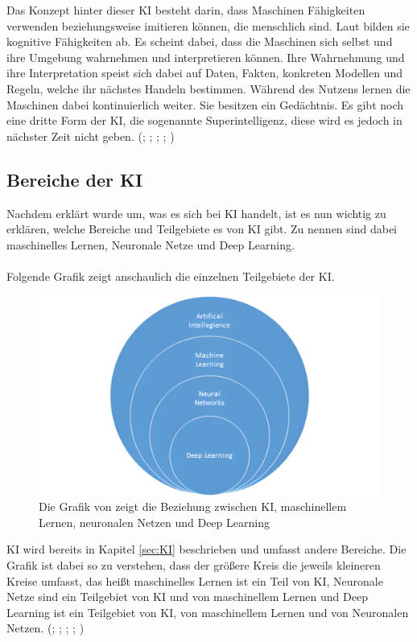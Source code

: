 \documentclass[12pt,toc=bib,toc=listof]{scrreprt}
\begin{document}
\noindent Das Konzept hinter dieser KI besteht darin, dass Maschinen Fähigkeiten verwenden beziehungsweise imitieren können, die menschlich sind. Laut \textcite{Hecker2018} bilden sie kognitive Fähigkeiten ab. Es scheint dabei, dass die Maschinen sich selbst und ihre Umgebung wahrnehmen und interpretieren können. Ihre Wahrnehmung und ihre Interpretation speist sich dabei auf Daten, Fakten, konkreten Modellen und Regeln, welche ihr nächstes Handeln bestimmen. Während des Nutzens lernen die Maschinen dabei kontinuierlich weiter. Sie besitzen ein Gedächtnis. Es gibt noch eine dritte Form der KI, die sogenannte Superintelligenz, diese wird es jedoch in nächster Zeit nicht geben. (\cite{Bhatt2021}; \cite{Hecker2018}; \cite{Mocko2021}; \cite{Roscher2025}; \cite{Zhu2021})

\subsection{Bereiche der KI} %
\label{sec:bereicheDerKI}
Nachdem erklärt wurde um, was es sich bei KI handelt, ist es nun wichtig zu erklären, welche Bereiche und Teilgebiete es von KI gibt. Zu nennen sind dabei maschinelles Lernen, Neuronale Netze und Deep Learning.\\
\\
Folgende Grafik zeigt anschaulich die einzelnen Teilgebiete der KI.
\begin{figure} [H]
    \centering
    \includegraphics[width=0.75\linewidth]{./Bilder/Mocko_Die Beziehung zwischen KI, maschinellem Lernen, neuronalen Netzen und Deep Learning.png}
    \caption{Die Grafik von \textcite{Mocko2021} zeigt die Beziehung zwischen KI, maschinellem Lernen, neuronalen Netzen und Deep Learning}
    \label{fig:enter-label}
\end{figure}
\noindent KI wird bereits in Kapitel \ref{sec:KI}  beschrieben und umfasst andere Bereiche. Die Grafik ist dabei so zu verstehen, dass der größere Kreis die jeweils kleineren Kreise umfasst, das heißt maschinelles Lernen ist ein Teil von KI, Neuronale Netze sind ein Teilgebiet von KI und von maschinellem Lernen und Deep Learning ist ein Teilgebiet von KI, von maschinellem Lernen und von Neuronalen Netzen. (\cite{Bhatt2021}; \cite{Hecker2018}; \cite{Mocko2021}; \cite{Roscher2025}; \cite{Zhu2021})\\
\end{document}
